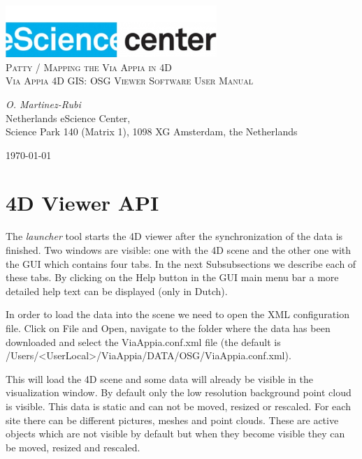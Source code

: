 \documentclass[a4paper,11pt]{article}
\begin{document}
\begin{titlepage}
\begin{center}
\includegraphics[width=0.6\textwidth]{fig/logo}\\[3cm]    
\textsc{\LARGE Patty / Mapping the Via Appia in 4D}\\[0.5cm]
\textsc{\large Via Appia 4D GIS: OSG Viewer Software User Manual}\\[0.5cm]
\vfill
\end{center}
{\large
\emph{O. Martinez-Rubi } \\
}
{\large
{Netherlands eScience Center, \\
Science Park 140 (Matrix 1), 1098 XG Amsterdam, the Netherlands\\
}
}
\begin{center}
{\large \today}
\end{center}
\end{titlepage}

\tableofcontents

\newpage

\section{4D Viewer API}

The \textit{launcher} tool starts the 4D viewer after the synchronization of the data is finished. Two windows are visible: one with the 4D scene and the other one with the GUI which contains four tabs. In the next Subsubsections we describe each of these tabs. By clicking on the Help button in the GUI main menu bar a more detailed help text can be displayed (only in Dutch). 

In order to load the data into the scene we need to open the XML configuration file. Click on File and Open, navigate to the folder where the data has been downloaded and select the ViaAppia.conf.xml file (the default is /Users/\textless{}UserLocal\textgreater{}/ViaAppia/DATA/OSG/ViaAppia.conf.xml).

This will load the 4D scene and some data will already be visible in the visualization window. By default only the low resolution background point cloud is visible. This data is static and can not be moved, resized or rescaled. For each site there can be different pictures, meshes and point clouds. These are active objects which are not visible by default but when they become visible they can be moved, resized and rescaled.
\end{document}

